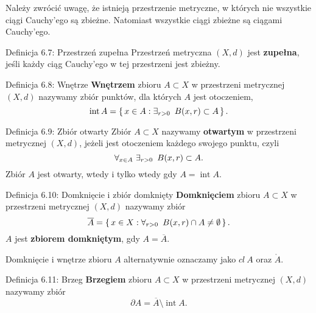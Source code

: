 \documentclass{article}
\newcommand{\hquad}{\mkern9mu}
\newcommand*\closure[1]{\overline{#1}}
\DeclareMathOperator{\interior}{int}
\begin{document}
Należy zwrócić uwagę, że istnieją przestrzenie metryczne, w których nie wszystkie ciągi Cauchy'ego są zbieżne. Natomiast
wszystkie ciągi zbieżne są ciągami Cauchy'ego.

\begin{defr}{Definicja 6.7: Przestrzeń zupełna}
    Przestrzeń metryczna $(X,d)$ jest \textbf{zupełna}, jeśli każdy ciąg Cauchy'ego w tej przestrzeni jest zbieżny.
\end{defr}

\begin{defr}{Definicja 6.8: Wnętrze}
    \textbf{Wnętrzem} zbioru $A\subset X$ w przestrzeni metrycznej $(X,d)$ nazywamy zbiór punktów, dla których $A$
    jest otoczeniem,
    \begin{equation*}
        \interior{A}=\set{x\in A:\exists_{r>0}\hquad B(x,r)\subset A}.
    \end{equation*}
\end{defr}

\begin{defr}{Definicja 6.9: Zbiór otwarty}
    Zbiór $A\subset X$ nazywamy \textbf{otwartym} w przestrzeni metrycznej $(X,d)$,
    jeżeli jest otoczeniem każdego swojego punktu, czyli
    \begin{equation*}
        \forall_{x\in A}\ \exists_{r>0}\hquad B(x,r)\subset A.
    \end{equation*}
    Zbiór $A$ jest otwarty, wtedy i tylko wtedy gdy $A=\interior{A}$.
\end{defr}

\begin{defr}{Definicja 6.10: Domknięcie i zbiór domknięty}
    \textbf{Domknięciem} zbioru $A\subset X$ w przestrzeni metrycznej $(X,d)$ nazywamy zbiór
    \begin{equation*}
        \closure{A}=\set{x\in X:\forall_{r>0}\hquad B(x,r)\cap A\neq\emptyset}.
    \end{equation*}
    $A$ jest \textbf{zbiorem domkniętym}, gdy $A=\closure{A}$.
\end{defr}

Domknięcie i wnętrze zbioru $A$ alternatywnie oznaczamy jako $cl\ A$ oraz $\mathring{A}$.

\begin{defr}{Definicja 6.11: Brzeg}
    \textbf{Brzegiem} zbioru $A\subset X$ w przestrzeni metrycznej $(X,d)$ nazywamy zbiór
    \begin{equation*}
        \partial{A}=\closure{A}\setminus\interior{A}.
    \end{equation*}
\end{defr}
\end{document}
